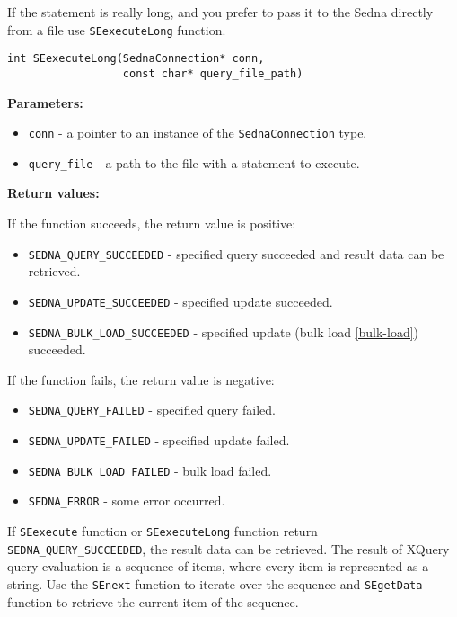 \documentclass[a4paper,12pt]{article}
\newenvironment{citemize}
{\begin{itemize}
  \setlength{\itemsep}{0pt}
  \setlength{\parskip}{0pt}
  \setlength{\parsep}{0pt}}
{\end{itemize}}
\begin{document}
If the statement is really long, and you prefer to pass it to the Sedna directly
from a file use \verb!SEexecuteLong! function.

\begin{verbatim}
int SEexecuteLong(SednaConnection* conn, 
                  const char* query_file_path)
\end{verbatim}

\noindent
\textbf{Parameters:}

\begin{citemize}
\item\verb!conn! - a pointer to an instance of the \verb!SednaConnection! type.
\item\verb!query_file! - a path to the file with a statement to execute.
\end{citemize}

\noindent
\textbf{Return values:}

\medskip

\noindent
If the function succeeds, the return value is positive:

\begin{citemize}
\item\verb!SEDNA_QUERY_SUCCEEDED! - specified query succeeded and result data
can be retrieved.
\item\verb!SEDNA_UPDATE_SUCCEEDED! - specified update succeeded.
\item\verb!SEDNA_BULK_LOAD_SUCCEEDED! - specified update (bulk load
\ref{bulk-load}) succeeded.
\end{citemize}

\noindent
If the function fails, the return value is negative:

\begin{citemize}
\item\verb!SEDNA_QUERY_FAILED! - specified query failed.
\item\verb!SEDNA_UPDATE_FAILED! - specified update failed.
\item\verb!SEDNA_BULK_LOAD_FAILED! - bulk load failed.
\item\verb!SEDNA_ERROR! - some error occurred.
\end{citemize}

If \verb!SEexecute! function or \verb!SEexecuteLong! function return
\verb!SEDNA_QUERY_SUCCEEDED!, the result data can be retrieved. The result of
XQuery query evaluation is a sequence of items, where every item is represented
as a string. Use the \verb!SEnext! function to iterate over the sequence and
\verb!SEgetData! function to retrieve the current item of the sequence.
\end{document}
